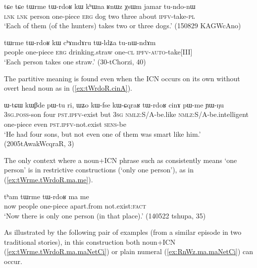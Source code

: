 \begin{exe}
\ex \label{ex:tWrme.tWrdoR.kW}
\gll  tɕe tɕe tɯrme tɯ-rdoʁ kɯ kʰɯna ʁnɯz χsɯm jamar tu-ndo-nɯ \\
\textsc{lnk} \textsc{lnk}  person one-piece \textsc{erg} dog two three about \textsc{ipfv}-take-\textsc{pl} \\
\glt `Each of them (of the hunters) takes two or three dogs.' (150829 KAGWcAno)
\end{exe} 

\begin{exe}
\ex \label{ex:tWrme.tWrdoR2}
\gll tɯrme tɯ-rdoʁ kɯ cʰɤmdɤru tɯ-ldʑa tu-nɯ-ndɤm  \\
people one-piece \textsc{erg} drinking.straw one-\textsc{cl} \textsc{ipfv-auto}-take[III] \\
\glt `Each person takes one straw.' (30-tChorzi, 40)
\end{exe}

The partitive meaning is found even when the ICN occurs on its own without overt head noun as in (\ref{ex:tWrdoR.cinA}).

 \begin{exe}
\ex \label{ex:tWrdoR.cinA}
\gll ɯ-tɕɯ kɯβde pɯ-tu ri, ɯʑo kɯ-fse kɯ-ɕqraʁ tɯ-rdoʁ cinɤ pɯ-me ɲɯ-ŋu 	\\
\textsc{3sg.poss}-son four \textsc{pst.ipfv}-exist but \textsc{3sg} \textsc{nmlz}:S/A-be.like \textsc{nmlz}:S/A-be.intelligent one-piece even \textsc{pst.ipfv}-not.exist \textsc{sens}-be \\
\glt `He had four sons, but not even one of them was smart like him.' (2005tAwakWcqraR, 3)
\end{exe} 

The only context where a noun+ICN phrase such as  consistently means `one person' is in restrictive constructions (`only one person'), as in (\ref{ex:tWrme.tWrdoR.ma.me}).  

\begin{exe}
\ex \label{ex:tWrme.tWrdoR.ma.me}
\gll tʰam tɯrme tɯ-rdoʁ ma me \\
now people one-piece apart.from not.exist:\textsc{fact} \\
\glt `Now there is only one person (in that place).' (140522 tshupa, 35)
\end{exe} 

As illustrated by the following pair of examples (from a similar episode in two traditional stories), in this construction both noun+ICN  (\ref{ex:tWrme.tWrdoR.ma.maNetCi})  or plain numeral (\ref{ex:RnWz.ma.maNetCi}) can occur.

